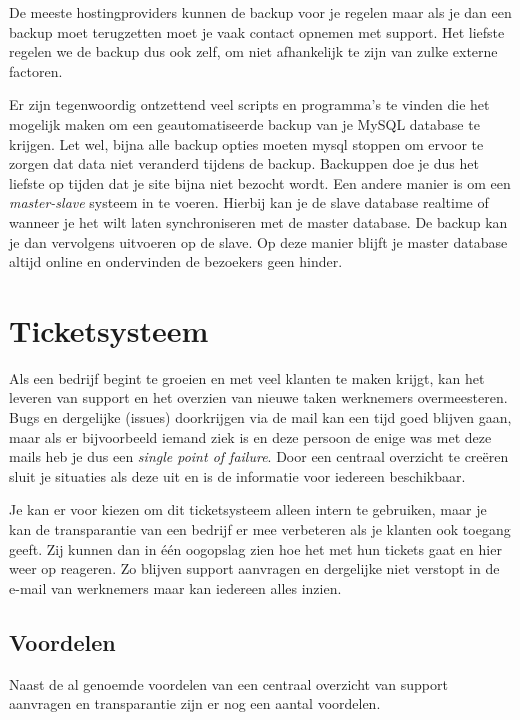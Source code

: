 De meeste hostingproviders kunnen de backup voor je regelen maar als je dan een backup moet terugzetten moet je vaak contact opnemen met support. Het liefste regelen we de backup dus ook zelf, om niet afhankelijk te zijn van zulke externe factoren.

Er zijn tegenwoordig ontzettend veel scripts en programma's te vinden die het mogelijk maken om een geautomatiseerde backup van je MySQL database te krijgen. Let wel, bijna alle backup opties moeten mysql stoppen om ervoor te zorgen dat data niet veranderd tijdens de backup. Backuppen doe je dus het liefste op tijden dat je site bijna niet bezocht wordt. Een andere manier is om een \emph{master-slave} systeem in te voeren. Hierbij kan je de slave database realtime of wanneer je het wilt laten synchroniseren met de master database. De backup kan je dan vervolgens uitvoeren op de slave. Op deze manier blijft je master database altijd online en ondervinden de bezoekers geen hinder.



\section{Ticketsysteem}

Als een bedrijf begint te groeien en met veel klanten te maken krijgt, kan het leveren van support en het overzien van nieuwe taken werknemers overmeesteren. Bugs en dergelijke (issues) doorkrijgen via de mail kan een tijd goed blijven gaan, maar als er bijvoorbeeld iemand ziek is en deze persoon de enige was met deze mails heb je dus een \emph{single point of failure}. Door een centraal overzicht te creëren sluit je situaties als deze uit en is de informatie voor iedereen beschikbaar.

Je kan er voor kiezen om dit ticketsysteem alleen intern te gebruiken, maar je kan de transparantie van een bedrijf er mee verbeteren als je klanten ook toegang geeft. Zij kunnen dan in één oogopslag zien hoe het met hun tickets gaat en hier weer op reageren. Zo blijven support aanvragen en dergelijke niet verstopt in de e-mail van werknemers maar kan iedereen alles inzien. 

\subsection{Voordelen}

Naast de al genoemde voordelen van een centraal overzicht van support aanvragen en transparantie zijn er nog een aantal voordelen.

